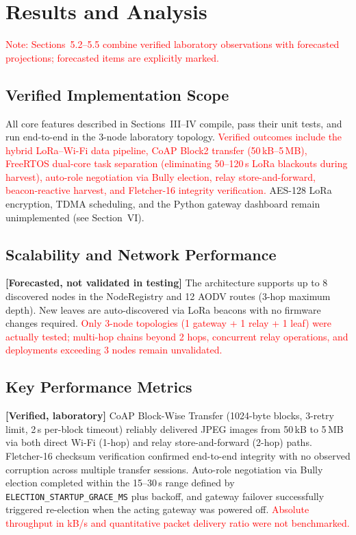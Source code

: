 \documentclass[12pt,a4paper]{article}
\newcommand{\changed}[1]{\textcolor{red}{#1}}
\begin{document}

\section{Results and Analysis}

\changed{Note: Sections~5.2--5.5 combine verified laboratory observations with forecasted projections; forecasted items are explicitly marked.}

\subsection{Verified Implementation Scope}

All core features described in Sections~III--IV compile, pass their unit tests, and run end-to-end in the 3-node laboratory topology. \changed{Verified outcomes include the hybrid LoRa--Wi-Fi data pipeline, CoAP Block2 transfer (50\,kB--5\,MB), FreeRTOS dual-core task separation (eliminating 50--120\,s LoRa blackouts during harvest), auto-role negotiation via Bully election, relay store-and-forward, beacon-reactive harvest, and Fletcher-16 integrity verification.} AES-128 LoRa encryption, TDMA scheduling, and the Python gateway dashboard remain unimplemented (see Section~VI).

\subsection{Scalability and Network Performance}

\textbf{[Forecasted, not validated in testing]} The architecture supports up to 8 discovered nodes in the NodeRegistry and 12 AODV routes (3-hop maximum depth). New leaves are auto-discovered via LoRa beacons with no firmware changes required. \changed{Only 3-node topologies (1 gateway + 1 relay + 1 leaf) were actually tested; multi-hop chains beyond 2 hops, concurrent relay operations, and deployments exceeding 3 nodes remain unvalidated.}

\subsection{Key Performance Metrics}

\textbf{[Verified, laboratory]} CoAP Block-Wise Transfer (1024-byte blocks, 3-retry limit, 2\,s per-block timeout) reliably delivered JPEG images from 50\,kB to 5\,MB via both direct Wi-Fi (1-hop) and relay store-and-forward (2-hop) paths. Fletcher-16 checksum verification confirmed end-to-end integrity with no observed corruption across multiple transfer sessions. Auto-role negotiation via Bully election completed within the 15--30\,s range defined by \texttt{ELECTION\_STARTUP\_GRACE\_MS} plus backoff, and gateway failover successfully triggered re-election when the acting gateway was powered off. \changed{Absolute throughput in kB/s and quantitative packet delivery ratio were not benchmarked.}
\end{document}
